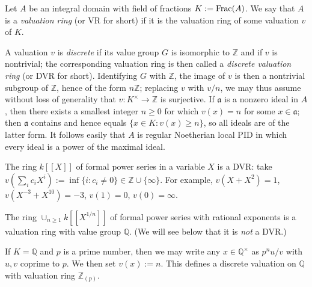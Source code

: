 \documentclass[10pt]{article}
\begin{document}
\begin{definition}
  Let $A$ be an integral domain with field of fractions
  $K := \operatorname{Frac}(A)$.  We say that $A$ is a \emph{valuation ring}
  (or VR for short) if it is the valuation ring of some
  valuation $v$ of $K$.

  A valuation $v$ is \emph{discrete} if its value group $G$ is
  isomorphic to $\mathbb{Z}$ and if $v$ is nontrivial; the
  corresponding valuation ring is then called a \emph{discrete
    valuation ring} (or DVR for short).  Identifying $G$ with
  $\mathbb{Z}$, the image of $v$ is then a nontrivial subgroup
  of $\mathbb{Z}$, hence of the form $n \mathbb{Z}$; replacing
  $v$ with $v/n$, we may thus assume without loss of generality
  that $v : K^\times \rightarrow \mathbb{Z}$ is surjective.  If
  $\mathfrak{a}$ is a nonzero ideal in $A$, then there exists a
  smallest integer $n \geq 0$ for which $v(x) = n$ for some
  $x \in \mathfrak{a}$; then $\mathfrak{a}$ contains and hence
  equals $\{x \in K : v(x) \geq n\}$, so all ideals are of the
  latter form.  It follows easily that $A$ is regular Noetherian
  local PID in which every ideal is a power of the maximal
  ideal.
\end{definition}

\begin{example}
  The ring $k[[X]]$ of formal power series in a variable $X$ is
  a DVR: take
  $v(\sum_{i} c_i X^i) := \inf \{i : c_i \neq 0\} \in \mathbb{Z}
  \cup \{\infty\}$.  For example, $v(X + X^2) = 1$,
  $v(X^{-3} + X^{10}) = -3$, $v(1) = 0$, $v(0) = \infty$.

  The ring $\cup_{n \geq 1} k[[X^{1/n}]]$ of formal power series
  with rational exponents is a valuation ring with value group
  $\mathbb{Q}$.  (We will see below that it is \emph{not} a
  DVR.)

  If $K = \mathbb{Q}$
  and
  $p$ is a prime number,
  then we may write any $x \in \mathbb{Q}^\times$
  as $p^n u/v$ with $u,v$ coprime to $p$.
  We then set $v(x) := n$.
  This defines a discrete valuation on $\mathbb{Q}$
  with valuation ring $\mathbb{Z}_{(p)}$.
\end{example}
\end{document}
